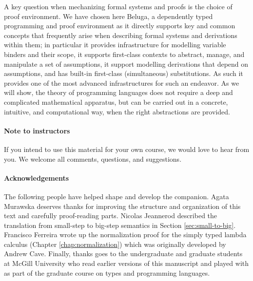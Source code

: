 A key question when mechanizing formal systems and proofs is the choice of proof environment.  We have chosen here Beluga, a dependently typed programming and proof environment as it directly supports key and common concepts that frequently arise when describing formal systems and derivations within them; in particular it provides infrastructure for modelling variable binders and their scope, it supports first-class contexts to abstract, manage, and manipulate a set of assumptions, it support modelling derivations that depend on assumptions, and has built-in first-class (simultaneous) substitutions.  As such it provides one of the most advanced infrastructures for such an endeavor. As we will show,  the theory of programming languages does
not require a deep and complicated mathematical apparatus, but can be carried out in a concrete, intuitive, and computational way, when the right abstractions are provided.



\paragraph{Note to instructors}
If you intend to use this material for your own course, we would love to hear from you. We welcome all comments, questions, and suggestions.

\paragraph{Acknowledgements} The following people have helped shape
and develop the companion. Agata Murawska deserves thanks for
improving the structure and organization of this text and carefully
proof-reading parts. Nicolas Jeannerod described the translation from
small-step to big-step semantics in Section \ref{sec:small-to-big}. Francisco Ferreira wrote up the normalization
proof for the simply typed lambda calculus (Chapter
\ref{chap:normalization}) which was originally developed by
Andrew Cave. Finally, thanks goes to the undergraduate and graduate
students at McGill University who read earlier versions of this
manuscript and played with \beluga as part of the graduate course on
types and programming languages.



